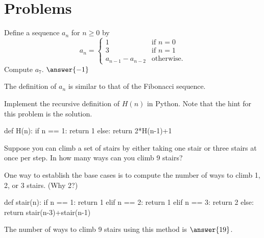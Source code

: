 \documentclass{ximera}
\begin{document}
\section{Problems}

\begin{question}
	Define a sequence $a_n$ for $n\geq 0$ by $$a_n=\begin{cases} 1 & \text{if $n=0$}\\ 3 & \text{if $n=1$}\\a_{n-1}-a_{n-2} & \text{otherwise.}\end{cases}$$ Compute $a_7$. $\answer{-1}$
	\begin{hint}
		The definition of $a_n$ is similar to that of the Fibonacci sequence.
	\end{hint}
\end{question}

\begin{question}
Implement the recursive definition of $H(n)$ in Python. Note that the hint for this problem is the solution.
	\begin{hint}
\begin{sageCell}
def H(n):
        if n == 1:
                return 1
        else:
		return 2*H(n-1)+1
\end{sageCell}
	\end{hint}
\end{question}

\begin{question}
Suppose you can climb a set of stairs by either taking one stair or three stairs at once per step. In how many ways can you climb 9 stairs?
	\begin{hint}
	One way to establish the base cases is to compute the number of ways to climb 1, 2, or 3 stairs. (Why 2?)
	\end{hint}
	\begin{hint}
\begin{sageCell}
def stair(n):
        if n == 1:
                return 1
        elif n == 2:
                return 1
        elif n == 3:
                return 2
        else:
                return stair(n-3)+stair(n-1)
\end{sageCell}
\end{hint}
The number of ways to climb 9 stairs using this method is $\answer{19}$.
\end{question}
\end{document}
